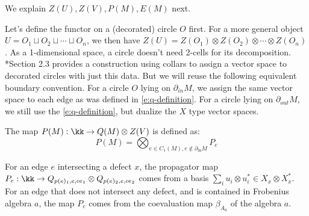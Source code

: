 \begin{defectfiguresetup}
We explain $Z(U), Z(V), P(M), E(M)$ next.


Let's define the functor on a (decorated) circle $O$ first. For a more general object $U=O_1 \sqcup O_2 \sqcup \cdots \sqcup O_n$, we then have $Z(U)=Z(O_1)\otimes Z(O_2) \otimes \cdots \otimes Z(O_n)$. As a 1-dimensional space, a circle doesn't need 2-cells for its decomposition.  *{Section 2.3} provides a construction using collars to assign a vector space to decorated circles with just this data. But we will reuse the following equivalent boundary convention. For a circle $O$ lying on $\partial_{in} M$, we assign the same vector space to each edge as was defined in \eqref{e:q-definition}. For a circle lying on $\partial_{out} M$, we still use the \eqref{e:q-definition}, but dualize the $X$ type vector spaces.

The map $P(M): \kk \rightarrow Q(M) \otimes Z(V)$ is defined as:
\begin{equation}
	P(M) = \bigotimes_{e \in C_1(M), e \notin \partial_{\mathrm{in}} M} P_e
\end{equation}

For an edge $e$ intersecting a defect $x$, the propagator map $P_e: \kk \rightarrow Q_{p(e)_1,e,\mathrm{or}_1} \otimes Q_{p(e)_2,e,\mathrm{or}_2}$ comes from a basis $\sum_{i} u_i \otimes u_i^* \in X_x \otimes X_x^*$. For an edge that does not intersect any defect, and is contained in Frobenius algebra $a$, the map $P_e$ comes from the coevaluation map $\beta_{A_a}$ of the algebra $a$.


\end{defectfiguresetup}

